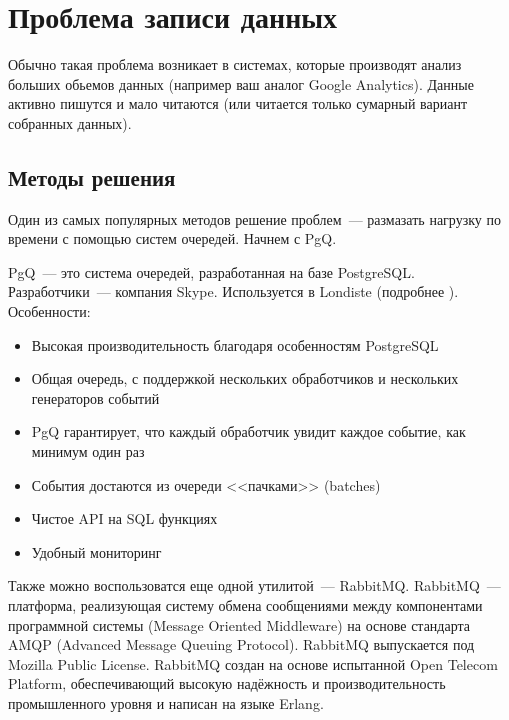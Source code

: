 \section{Проблема записи данных}

Обычно такая проблема возникает в системах, которые производят анализ больших обьемов данных (например ваш аналог Google Analytics). 
Данные активно пишутся и мало читаются (или читается только сумарный вариант собранных данных).

\subsection{Методы решения}

Один из самых популярных методов решение проблем~--- размазать нагрузку по времени с помощью систем очередей. 
Начнем с PgQ. 

PgQ~--- это система очередей, разработанная на базе PostgreSQL. Разработчики~--- компания Skype. 
Используется в Londiste (подробнее ). Особенности:
\begin{itemize}
\item Высокая производительность благодаря особенностям PostgreSQL
\item Общая очередь, с поддержкой нескольких обработчиков и нескольких генераторов событий
\item PgQ гарантирует, что каждый обработчик увидит каждое событие, как минимум один раз
\item События достаются из очереди <<пачками>> (batches)
\item Чистое API на SQL функциях
\item Удобный мониторинг
\end{itemize}

Также можно воспользоватся еще одной утилитой~--- RabbitMQ. 
RabbitMQ~--- платформа, реализующая систему обмена сообщениями между компонентами программной системы (Message Oriented Middleware) 
на основе стандарта AMQP (Advanced Message Queuing Protocol). RabbitMQ выпускается под Mozilla Public License.
RabbitMQ создан на основе испытанной Open Telecom Platform, обеспечивающий высокую надёжность и производительность промышленного 
уровня и написан на языке Erlang. 

